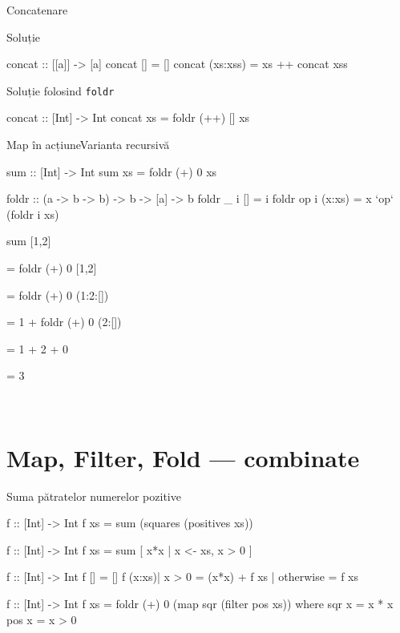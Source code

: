 \documentclass[handout,xcolor=pdftex,romanian,colorlinks]{beamer}
\begin{document}
\begin{frame}[fragile]{Concatenare}
\begin{block}{Soluție }
\begin{asciihs}
concat :: [[a]] -> [a]
concat []       = []
concat (xs:xss) = xs ++ concat xss
\end{asciihs}
\end{block}
\begin{block}{Soluție folosind \lstinline$foldr$}
\begin{asciihs}
concat :: [Int] -> Int
concat xs = foldr (++) [] xs
\end{asciihs}
\end{block}
\end{frame}


\begin{frame}[fragile]{Map în acțiune}{Varianta recursivă}
\begin{asciihs}
sum :: [Int] -> Int
sum xs = foldr (+) 0 xs

foldr :: (a -> b -> b) -> b -> [a] -> b
foldr _ i []      = i
foldr op i (x:xs) = x `op` (foldr i xs)
\end{asciihs}

\vfill
sum [1,2]

\medskip
= foldr (+) 0 [1,2]

\medskip
= foldr (+) 0 (1:2:[])

\medskip
{}
= 1 + foldr (+) 0 (2:[])

\medskip
{}
= 1 + 2 + 0

\medskip
= 3

\medskip

\vfill\
\end{frame}

\section{Map, Filter, Fold --- combinate}

\begin{frame}[fragile]{Suma pătratelor numerelor pozitive}
\begin{asciihs}
f :: [Int] -> Int
f xs = sum (squares (positives xs))

f :: [Int] -> Int
f xs = sum [ x*x | x <- xs, x > 0 ]

f :: [Int] -> Int
f []                = []
f (x:xs)| x > 0     = (x*x) + f xs
        | otherwise = f xs
        
f :: [Int] -> Int
f xs = foldr (+) 0 (map sqr (filter pos xs))
  where
    sqr x = x * x
    pos x = x > 0
\end{asciihs}
\end{frame}
\end{document}
